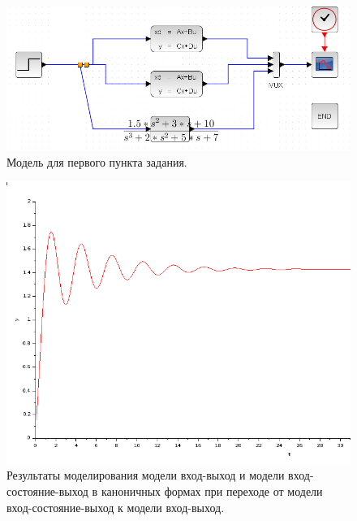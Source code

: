 \documentclass[12pt, a4paper] {ncc}
\begin{document}
	\begin{figure}[ht!]
		\includegraphics[scale=0.5]{./model1.png}
		\caption{Модель для первого пункта задания.}
	\end{figure}
	\begin{figure}[ht!]
		\includegraphics[scale=0.5]{./plot1.png}
		\caption{Результаты моделирования модели вход-выход и модели вход-состояние-выход в каноничных формах
			     при переходе от модели вход-состояние-выход к модели вход-выход.}
	\end{figure}
\end{document}
